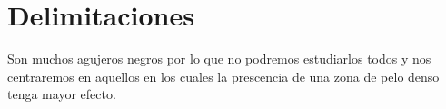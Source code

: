 \documentclass[../Main.tex]{subfiles}
\begin{document}
\section{Delimitaciones}
Son muchos agujeros negros por lo que no podremos estudiarlos todos y nos centraremos en aquellos en los cuales la prescencia de una zona de pelo denso tenga mayor efecto.







\end{document}
